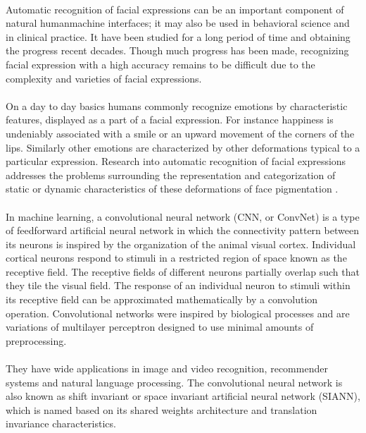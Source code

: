\documentclass[a4paper,12pt,oneside]{article}
\begin{document}
\paragraph{}
Automatic recognition of facial expressions can be an important component of  natural  humanmachine  interfaces;  it  may  also  be  used  in behavioral  science  and  in  clinical  practice. It have been studied for a long period of time and obtaining the progress recent decades. Though much progress has been made, recognizing facial expression with a high accuracy remains to be difficult due to the complexity and varieties of facial expressions.
\paragraph{}
On a day to day basics humans commonly recognize emotions by characteristic features, displayed as a part of a facial expression. For instance happiness is undeniably associated with a smile or an upward movement of the corners of the lips. Similarly other emotions are characterized by other deformations typical to a particular expression. Research into automatic recognition of facial expressions addresses the problems surrounding the representation and categorization of static or dynamic characteristics of these deformations of face pigmentation .    
\paragraph{}
In machine learning, a convolutional neural network (CNN, or ConvNet) is a type of feedforward artificial neural network in which the connectivity pattern between its neurons is inspired by the organization of the animal visual cortex. Individual cortical neurons respond to stimuli in a restricted region of space known as the receptive field. The receptive fields of different neurons partially overlap such that they tile the visual field. The response of an individual neuron to stimuli within its receptive field can be approximated mathematically by a convolution operation. Convolutional networks were inspired by biological processes and are variations of multilayer perceptron designed to use minimal amounts of preprocessing.
\paragraph{}
They have wide applications in image and video recognition, recommender systems and natural language processing. The convolutional neural network is also known as shift invariant or space invariant artificial neural network (SIANN), which is named based on its shared weights architecture and translation invariance characteristics. 
\end{document}
